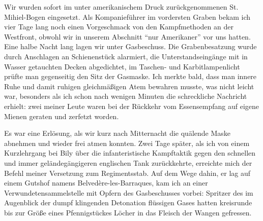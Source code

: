 Wir wurden sofort im unter amerikanischem Druck zurückgenommenen St. Mihiel-Bogen eingesetzt. Als Kompanieführer im vordersten Graben bekam ich vier Tage lang noch einen Vorgeschmack von den Kampfmethoden an der Westfront, obwohl wir in unserem Abschnitt \enquote{nur Amerikaner} vor uns hatten. Eine halbe Nacht lang lagen wir unter Gasbeschuss. Die Grabenbesatzung wurde durch Anschlagen an Schienenstück alarmiert, die Unterstandseingänge mit in Wasser getauchten Decken abgedichtet, im Taschen- und Karbitlampenlicht prüfte man gegenseitig den Sitz der Gasmaske. Ich merkte bald, dass man innere Ruhe und damit ruhigen gleichmäßigen Atem bewahren musste, was nicht leicht war, besonders als ich schon nach wenigen Minuten die schreckliche Nachricht erhielt: zwei meiner Leute waren bei der Rückkehr vom Essensempfang auf eigene Mienen geraten und zerfetzt worden.

Es war eine Erlösung, als wir kurz nach Mitternacht die quälende Maske abnehmen und wieder frei atmen konnten. Zwei Tage später, als ich von einem Kurzlehrgang bei Bily über die infanteristische Kampftaktik gegen den schnellen und immer geländegängigeren englischen Tank zurückkehrte, erreichte mich der Befehl meiner Versetzung zum Regimentsstab. Auf dem Wege dahin, er lag auf einem Gutshof namens Belvedère-les-Barraques, kam ich an einer Verwundetensammelstelle mit Opfern des Gasbeschusses vorbei: Spritzer des im Augenblick der dumpf klingenden Detonation flüssigen Gases hatten kreisrunde bis zur Größe eines Pfennigstückes Löcher in das Fleisch der Wangen gefressen.

